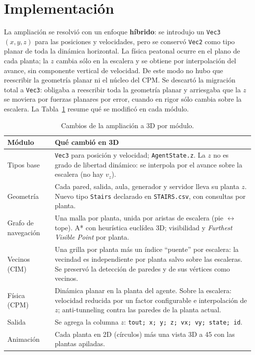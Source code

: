 \documentclass[11pt,a4paper]{article}
\begin{document}
\section{Implementación}
\label{sec:impl}

La ampliación se resolvió con un enfoque \textbf{híbrido}: se introdujo un \texttt{Vec3}~$(x,y,z)$
para las posiciones y velocidades, pero se conservó \texttt{Vec2} como tipo planar de toda la
dinámica horizontal. La física peatonal ocurre en el plano de cada planta; la $z$ cambia sólo
en la escalera y se obtiene por interpolación del avance, sin componente vertical de velocidad.
De este modo no hubo que reescribir la geometría planar ni el núcleo del CPM. Se descartó la
migración total a \texttt{Vec3}: obligaba a reescribir toda la geometría planar y arriesgaba que
la $z$ se moviera por fuerzas planares por error, cuando en rigor sólo cambia sobre la escalera.
La Tabla~\ref{tab:modulos} resume qué se modificó en cada módulo.

\begin{table}[H]
\centering
\small
\begin{tabular}{@{}p{3.0cm}p{10.4cm}@{}}
\toprule
\textbf{Módulo} & \textbf{Qué cambió en 3D} \\
\midrule
Tipos base & \texttt{Vec3} para posición y velocidad; \texttt{AgentState.z}. La $z$ no es
grado de libertad dinámico: se interpola por el avance sobre la escalera (no hay $v_z$). \\
\addlinespace
Geometría & Cada pared, salida, aula, generador y servidor lleva su planta $z$. Nuevo tipo
\texttt{Stairs} declarado en \texttt{STAIRS.csv}, con consultas por planta. \\
\addlinespace
Grafo de navegación & Una malla por planta, unida por aristas de escalera (pie
$\leftrightarrow$ tope). A* con heurística euclídea 3D; visibilidad y \emph{Furthest Visible
Point} por planta. \\
\addlinespace
Vecinos (CIM) & Una grilla por planta más un índice ``puente'' por escalera: la vecindad es
independiente por planta salvo sobre las escaleras. Se preservó la detección de paredes y de
sus vértices como vecinos. \\
\addlinespace
Física (CPM) & Dinámica planar en la planta del agente. Sobre la escalera: velocidad reducida
por un factor configurable e interpolación de $z$; anti-tunneling contra las paredes de la
planta actual. \\
\addlinespace
Salida & Se agrega la columna $z$: \texttt{tout; x; y; z; vx; vy; state; id}. \\
\addlinespace
Animación & Cada planta en 2D (círculos) más una vista 3D a 45\textdegree{} con las plantas
apiladas. \\
\bottomrule
\end{tabular}
\caption{Cambios de la ampliación a 3D por módulo.}
\label{tab:modulos}
\end{table}
\end{document}
